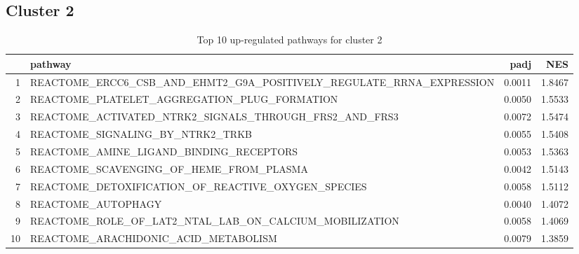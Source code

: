 \documentclass{article}
\begin{document}
\subsection{Cluster 2 }
\begin{table}[H]
\centering
\begin{tabularx}{\textwidth}{rlrr}
  \hline
 & pathway & padj & NES \\ 
  \hline
1 & REACTOME\_ERCC6\_CSB\_AND\_EHMT2\_G9A\_POSITIVELY\_REGULATE\_RRNA\_EXPRESSION & 0.0011 & 1.8467 \\ 
  2 & REACTOME\_PLATELET\_AGGREGATION\_PLUG\_FORMATION & 0.0050 & 1.5533 \\ 
  3 & REACTOME\_ACTIVATED\_NTRK2\_SIGNALS\_THROUGH\_FRS2\_AND\_FRS3 & 0.0072 & 1.5474 \\ 
  4 & REACTOME\_SIGNALING\_BY\_NTRK2\_TRKB & 0.0055 & 1.5408 \\ 
  5 & REACTOME\_AMINE\_LIGAND\_BINDING\_RECEPTORS & 0.0053 & 1.5363 \\ 
  6 & REACTOME\_SCAVENGING\_OF\_HEME\_FROM\_PLASMA & 0.0042 & 1.5143 \\ 
  7 & REACTOME\_DETOXIFICATION\_OF\_REACTIVE\_OXYGEN\_SPECIES & 0.0058 & 1.5112 \\ 
  8 & REACTOME\_AUTOPHAGY & 0.0040 & 1.4072 \\ 
  9 & REACTOME\_ROLE\_OF\_LAT2\_NTAL\_LAB\_ON\_CALCIUM\_MOBILIZATION & 0.0058 & 1.4069 \\ 
  10 & REACTOME\_ARACHIDONIC\_ACID\_METABOLISM & 0.0079 & 1.3859 \\ 
   \hline
\end{tabularx}
\caption{Top 10 up-regulated pathways for cluster 2} 
\label{tab:q3_2_2}
\end{table}
\end{document}
